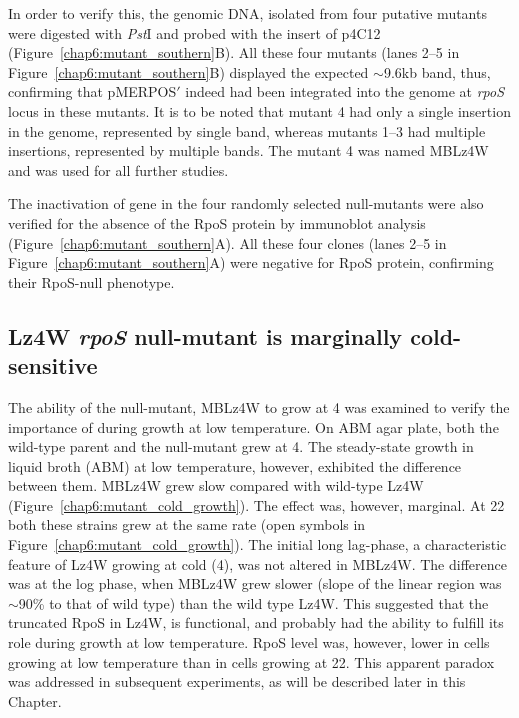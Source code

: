 In order to verify this, the genomic DNA, isolated from four
putative mutants were digested with \emph{Pst}I and probed with
the insert of p4C12 (Figure~\ref{chap6:mutant_southern}B)\@. All
these four mutants (lanes 2--5 in
Figure~\ref{chap6:mutant_southern}B) displayed the expected
\U{$\sim$9.6}{kb} band, thus, confirming that pMERPOS$'$ indeed
had been integrated into the genome at \emph{rpoS} locus in these
mutants. It is to be noted that mutant 4 had only a single
insertion in the genome, represented by single band, whereas
mutants 1--3 had multiple insertions, represented by multiple
bands. The mutant 4 was named MBLz4W and  was used for all further
studies.

The inactivation of  gene in the four randomly selected
null-mutants were also verified for the absence of the RpoS
protein by immunoblot analysis
(Figure~\ref{chap6:mutant_southern}A)\@. All these four clones
(lanes 2--5 in Figure~\ref{chap6:mutant_southern}A) were negative
for RpoS protein, confirming their RpoS-null phenotype.


\subsection{Lz4W \emph{rpoS} null-mutant is marginally cold-sensitive}

The ability of the  null-mutant, MBLz4W to grow at 4\dg{}
was examined to verify the importance of  during growth at
low temperature. On ABM agar plate, both the wild-type parent and
the null-mutant grew at 4\dg{}. The steady-state growth in liquid
broth (ABM) at low temperature, however, exhibited the difference
between them. MBLz4W grew slow compared with wild-type Lz4W
(Figure~\ref{chap6:mutant_cold_growth}). The effect was, however,
marginal. At 22\dg{} both these strains grew at the same rate
(open symbols in Figure~\ref{chap6:mutant_cold_growth}). The
initial long lag-phase, a characteristic feature of Lz4W growing
at cold (4\dg{}), was not altered in MBLz4W. The difference was at
the log phase, when MBLz4W grew slower (slope of the linear region
was $\sim$90\% to that of wild type) than the wild type Lz4W. This
suggested that the truncated RpoS in Lz4W, is functional, and
probably had the ability to fulfill its role during growth at low
temperature. RpoS level was, however, lower in cells growing at
low temperature than in cells growing at 22\dg{}\@. This apparent
paradox was addressed in subsequent experiments, as will be
described later in this Chapter.


